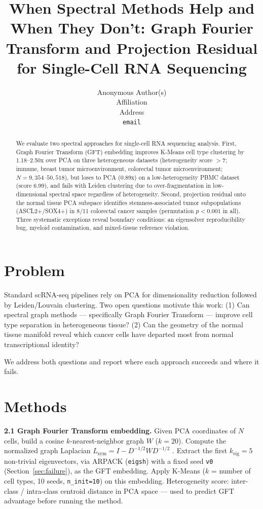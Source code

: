 \documentclass{article}
\title{When Spectral Methods Help and When They Don't: Graph Fourier Transform and Projection Residual for Single-Cell RNA Sequencing}
\author{%
  Anonymous Author(s) \\
  Affiliation \\
  Address \\
  \texttt{email}
}
\begin{document}
\maketitle

\begin{abstract}
We evaluate two spectral approaches for single-cell RNA sequencing analysis. First, Graph Fourier Transform (GFT) embedding improves K-Means cell type clustering by 1.18--2.50x over PCA on three heterogeneous datasets (heterogeneity score $>7$; immune, breast tumor microenvironment, colorectal tumor microenvironment; $N=9{,}354$--$50{,}518$), but loses to PCA (0.89x) on a low-heterogeneity PBMC dataset (score $6.99$), and fails with Leiden clustering due to over-fragmentation in low-dimensional spectral space regardless of heterogeneity. Second, projection residual onto the normal tissue PCA subspace identifies stemness-associated tumor subpopulations (ASCL2+/SOX4+) in 8/11 colorectal cancer samples (permutation $p<0.001$ in all). Three systematic exceptions reveal boundary conditions: an eigensolver reproducibility bug, myeloid contamination, and mixed-tissue reference violation.
\end{abstract}

\section{Problem}
\label{sec:problem}

Standard scRNA-seq pipelines rely on PCA for dimensionality reduction followed by Leiden/Louvain clustering. Two open questions motivate this work: (1) Can spectral graph methods --- specifically Graph Fourier Transform --- improve cell type separation in heterogeneous tissue? (2) Can the geometry of the normal tissue manifold reveal which cancer cells have departed most from normal transcriptional identity?

We address both questions and report where each approach succeeds and where it fails.

\section{Methods}
\label{sec:method}

\textbf{2.1 Graph Fourier Transform embedding.} Given PCA coordinates of $N$ cells, build a cosine $k$-nearest-neighbor graph $W$ ($k=20$). Compute the normalized graph Laplacian $L_\text{sym} = I - D^{-1/2}WD^{-1/2}$ \citep{luxburg2007}. Extract the first $k_\text{eig}=5$ non-trivial eigenvectors, via ARPACK (\texttt{eigsh}) with a fixed seed \texttt{v0} (Section~\ref{sec:failure}), as the GFT embedding. Apply K-Means ($k$ = number of cell types, 10 seeds, \texttt{n\_init=10}) on this embedding. Heterogeneity score: inter-class / intra-class centroid distance in PCA space --- used to predict GFT advantage before running the method.
\end{document}
